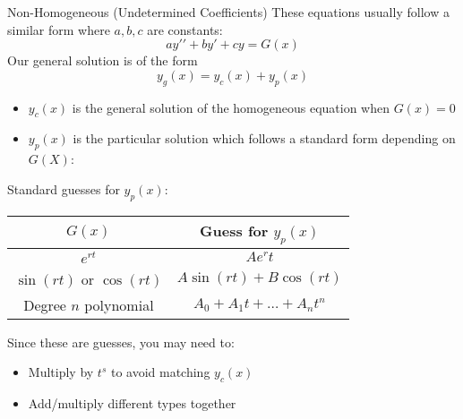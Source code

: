 \documentclass[12pt]{report}
\begin{document}
\begin{genbox}{Non-Homogeneous (Undetermined Coefficients)}
	These equations usually follow a similar form where $a,b,c$ are constants:
	$$ay\prime\prime + by\prime + cy = G(x)$$
	Our general solution is of the form
	$$y_g(x) = y_c(x) + y_p(x)$$
	\begin{itemize}
		\item $y_c(x)$ is the general solution of the homogeneous equation when $G(x)=0$
		\item $y_p(x)$ is the particular solution which follows a standard form depending on $G(X)$:
	\end{itemize}
	Standard guesses for $y_p(x)$:
	\begin{center}
		\begin{tabular}{|c|c|} \hline
			$G(x)$ & Guess for $y_p(x)$ \\ \hline
			$e^{rt}$ & $Ae^rt$ \\ \hline
			$\sin(rt)$ or $\cos(rt)$ & $A\sin(rt) + B\cos(rt)$ \\ \hline
			Degree $n$ polynomial & $A_0 + A_1t + \ldots + A_nt^n$ \\ \hline
		\end{tabular}
	\end{center}

	Since these are guesses, you may need to:
	\begin{itemize}
		\item Multiply by $t^s$ to avoid matching $y_c(x)$
		\item Add/multiply different types together
	\end{itemize}

\end{genbox}
\end{document}
